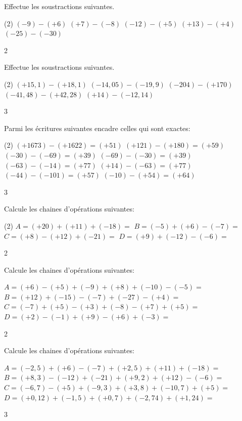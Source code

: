 \documentclass[a4paper,11pt]{report}
\begin{document}
\begin{exo}
{Effectue les soustractions suivantes.
\begin{tasks}(2)
\task $(-9)-(+6)$
\task $(+7)-(-8)$
\task $(-12)-(+5)$
\task $(+13)-(+4)$
\task $(-25)-(-30)$
\end{tasks}}{2}
\end{exo}

\begin{exo}
{Effectue les soustractions suivantes.
\begin{tasks}(2)
\task $(+15,\!1)-(+18,\!1)$
\task $(-14,\!05)-(-19,\!9)$
\task $(-204)-(+170)$
\task $(-41,\!48)-(+42,\!28)$
\task $(+14)-(-12,\!14)$
\end{tasks}}{3}
\end{exo}

\begin{exop}
{Parmi les écritures suivantes encadre celles qui sont exactes:
\begin{tasks}(2)
\task $(+1673)-(+1622)=(+51)$
\task $(+121)-(+180)=(+59)$
\task $(-30)-(-69)=(+39)$
\task $(-69)-(-30)=(+39)$
\task $(-63)-(-14)=(+77)$
\task $(+14)-(-63)=(+77)$
\task $(-44)-(-101)=(+57)$
\task $(-10)-(+54)=(+64)$
\end{tasks}
}{3}
\end{exop}


\begin{exo}
{Calcule les chaines d'opérations suivantes:
\begin{tasks}(2)
\task $A=(+20)+(+11)+(-18)=$
\task $B=(-5)+(+6)-(-7)=$
\task $C=(+8)-(+12)+(-21)=$
\task $D=(+9)+(-12)-(-6)=$
\end{tasks}
}{2}
\end{exo}

\begin{exo}
{Calcule les chaines d'opérations suivantes:
\begin{tasks}
\task $A=(+6)-(+5)+(-9)+(+8)+(-10)-(-5)=$
\task $B=(+12)+(-15)-(-7)+(-27)-(+4)=$
\task $C=(-7)+(+5)-(+3)+(-8)-(+7)+(+5)=$
\task $D=(+2)-(-1)+(+9)-(+6)+(-3)=$
\end{tasks}
}{2}
\end{exo}

\begin{exo}
{Calcule les chaines d'opérations suivantes:
\begin{tasks}
\task $A=(-2,\!5)+(+6)-(-7)+(+2,\!5)+(+11)+(-18)=$
\task $B=(+8,\!3)-(-12)+(-21)+(+9,\!2)+(+12)-(-6)=$
\task $C=(-6,\!7)-(+5)+(-9,\!3)+(+3,\!8)+(-10,\!7)+(+5)=$
\task $D=(+0,\!12)+(-1,\!5)+(+0,\!7)+(-2,\!74)+(+1,\!24)=$
\end{tasks}
}{3}
\end{exo}
\end{document}
